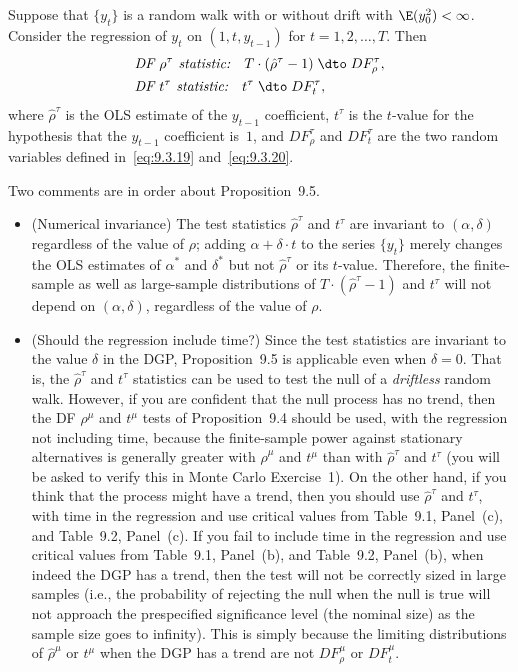 \begin{proposition}
\label{prop:9.5}
Suppose that $\{y_t\}$ is a random walk with or without drift with $\E(y_0^2) < \infty$. Consider the regression of $y_t$ on $(1, t, y_{t-1})$ for $t = 1, 2, \ldots, T$. Then
\begin{align}
&\textit{DF $\rho^\tau$ statistic:}\quad T \cdot (\hat{\rho}^\tau - 1) \;\dto\; DF_\rho^\tau,
\label{eq:9.3.21} \\
&\textit{DF $t^\tau$ statistic:}\quad t^\tau \;\dto\; DF_t^\tau,
\label{eq:9.3.22}
\end{align}
where $\hat{\rho}^\tau$ is the OLS estimate of the $y_{t-1}$ coefficient, $t^\tau$ is the $t$-value for the hypothesis that the $y_{t-1}$ coefficient is~$1$, and $DF_\rho^\tau$ and $DF_t^\tau$ are the two random variables
defined in~\eqref{eq:9.3.19} and~\eqref{eq:9.3.20}.
\end{proposition}

Two comments are in order about Proposition~9.5.

\begin{itemize}
\item (Numerical invariance) \enspace The test statistics $\hat{\rho}^\tau$ and $t^\tau$ are invariant to $(\alpha, \delta)$ regardless of the value of $\rho$; adding $\alpha + \delta \cdot t$ to the series $\{y_t\}$ merely changes the OLS
estimates of $\alpha^*$ and $\delta^*$ but not $\hat{\rho}^\tau$ or its $t$-value. Therefore, the finite-sample
as well as large-sample distributions of $T \cdot (\hat{\rho}^\tau - 1)$ and $t^\tau$ will not depend on
$(\alpha, \delta)$, regardless of the value of $\rho$.

\item (Should the regression include time?) \enspace Since the test statistics are invariant to
the value $\delta$ in the DGP, Proposition~9.5 is applicable even when $\delta = 0$. That is,
the $\hat{\rho}^\tau$ and $t^\tau$ statistics can be used to test the null of a \emph{driftless} random walk.
However, if you are confident that the null process has no trend, then the DF $\rho^\mu$
and $t^\mu$ tests of Proposition~9.4 should be used, with the regression not including
time, because the finite-sample power against stationary alternatives is generally
greater with $\hat{\rho}^\mu$ and $t^\mu$ than with $\hat{\rho}^\tau$ and $t^\tau$ (you will be asked to verify this in
Monte Carlo Exercise~1). On the other hand, if you think that the process might
have a trend, then you should use $\hat{\rho}^\tau$ and $t^\tau$, with time in the regression and use critical values from Table~9.1, Panel~(c), and Table~9.2, Panel~(c). If you
fail to include time in the regression and use critical values from Table~9.1, Panel~(b), and Table~9.2, Panel~(b), when indeed the DGP has a trend, then the test will
not be correctly sized in large samples (i.e., the probability of rejecting the null
when the null is true will not approach the prespecified significance level (the
nominal size) as the sample size goes to infinity). This is simply because the
limiting distributions of $\hat{\rho}^\mu$ or $t^\mu$ when the DGP has a trend are not $DF_\rho^\mu$ or
$DF_t^\mu$.
\end{itemize}

